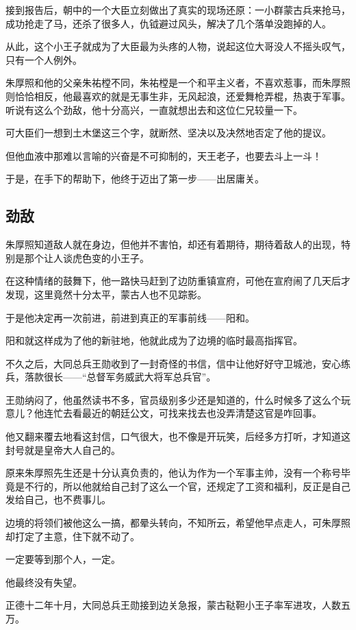 \begin{multicols}{\theparacolNo}
		接到报告后，朝中的一个大臣立刻做出了真实的现场还原：一小群蒙古兵来抢马，成功抢走了马，还杀了很多人，仇钺避过风头，解决了几个落单没跑掉的人。

		从此，这个小王子就成为了大臣最为头疼的人物，说起这位大哥没人不摇头叹气，只有一个人例外。

		朱厚照和他的父亲朱祐樘不同，朱祐樘是一个和平主义者，不喜欢惹事，而朱厚照则恰恰相反，他最喜欢的就是无事生非，无风起浪，还爱舞枪弄棍，热衷于军事。听说有这么个劲敌，他十分高兴，一直就想出去和这位仁兄较量一下。

		可大臣们一想到土木堡这三个字，就断然、坚决以及决然地否定了他的提议。

		但他血液中那难以言喻的兴奋是不可抑制的，天王老子，也要去斗上一斗！

		于是，在手下的帮助下，他终于迈出了第一步——出居庸关。

		\subsection{劲敌}
		朱厚照知道敌人就在身边，但他并不害怕，却还有着期待，期待着敌人的出现，特别是那个让人谈虎色变的小王子。

		在这种情绪的鼓舞下，他一路快马赶到了边防重镇宣府，可他在宣府闹了几天后才发现，这里竟然十分太平，蒙古人也不见踪影。

		于是他决定再一次前进，前进到真正的军事前线——阳和。

		阳和就这样成为了他的新驻地，他就此成为了边境的临时最高指挥官。

		不久之后，大同总兵王勋收到了一封奇怪的书信，信中让他好好守卫城池，安心练兵，落款很长——“总督军务威武大将军总兵官”。

		王勋纳闷了，他虽然读书不多，官员级别多少还是知道的，什么时候多了这么个玩意儿？他连忙去看最近的朝廷公文，可找来找去也没弄清楚这官是咋回事。

		他又翻来覆去地看这封信，口气很大，也不像是开玩笑，后经多方打听，才知道这封号就是皇帝大人自己的。

		原来朱厚照先生还是十分认真负责的，他认为作为一个军事主帅，没有一个称号毕竟是不行的，所以他就给自己封了这么一个官，还规定了工资和福利，反正是自己发给自己，也不费事儿。

		边境的将领们被他这么一搞，都晕头转向，不知所云，希望他早点走人，可朱厚照却打定了主意，住下就不动了。

		一定要等到那个人，一定。

		他最终没有失望。

		正德十二年十月，大同总兵王勋接到边关急报，蒙古鞑靼小王子率军进攻，人数五万。


\end{multicols}
